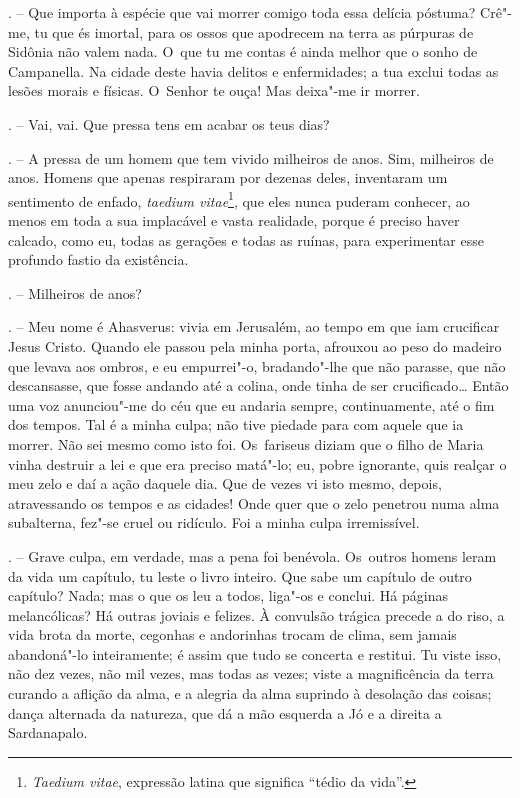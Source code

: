 \begin{Parskip}
. -- Que importa à espécie que vai morrer comigo toda essa
delícia póstuma? Crê"-me, tu que és imortal, para os ossos que apodrecem
na terra as púrpuras de Sidônia não valem nada. O~que tu me contas é
ainda melhor que o sonho de Campanella. Na cidade deste havia delitos e
enfermidades; a tua exclui todas as lesões morais e físicas. O~Senhor te
ouça! Mas deixa"-me ir morrer.

. -- Vai, vai. Que pressa tens em acabar os teus dias?

. -- A pressa de um homem que tem vivido milheiros de anos.
Sim, milheiros de anos. Homens que apenas respiraram por dezenas deles,
inventaram um sentimento de enfado, \emph{taedium vitae}\footnote{\emph{Taedium
  vitae}, expressão latina que significa ``tédio da vida''.}, que eles
nunca puderam conhecer, ao menos em toda a sua implacável e vasta
realidade, porque é preciso haver calcado, como eu, todas as gerações e
todas as ruínas, para experimentar esse profundo fastio da existência.

. -- Milheiros de anos?

. -- Meu nome é Ahasverus: vivia em Jerusalém, ao tempo em que
iam crucificar Jesus Cristo. Quando ele passou pela minha porta,
afrouxou ao peso do madeiro que levava aos ombros, e eu empurrei"-o,
bradando"-lhe que não parasse, que não descansasse, que fosse andando até
a colina, onde tinha de ser crucificado\ldots{} Então uma voz anunciou"-me do
céu que eu andaria sempre, continuamente, até o fim dos tempos. Tal é a
minha culpa; não tive piedade para com aquele que ia morrer. Não sei
mesmo como isto foi. Os~fariseus diziam que o filho de Maria vinha
destruir a lei e que era preciso matá"-lo; eu, pobre ignorante, quis
realçar o meu zelo e daí a ação daquele dia. Que de vezes vi isto mesmo,
depois, atravessando os tempos e as cidades! Onde quer que o zelo
penetrou numa alma subalterna, fez"-se cruel ou ridículo. Foi a minha
culpa irremissível.

. -- Grave culpa, em verdade, mas a pena foi benévola. Os~outros
homens leram da vida um capítulo, tu leste o livro inteiro. Que sabe um
capítulo de outro capítulo? Nada; mas o que os leu a todos, liga"-os e
conclui. Há páginas melancólicas? Há outras joviais e felizes. À
convulsão trágica precede a do riso, a vida brota da morte, cegonhas e
andorinhas trocam de clima, sem jamais abandoná"-lo inteiramente; é assim
que tudo se concerta e restitui. Tu viste isso, não dez vezes, não mil
vezes, mas todas as vezes; viste a magnificência da terra curando a
aflição da alma, e a alegria da alma suprindo à desolação das coisas;
dança alternada da natureza, que dá a mão esquerda a Jó e a direita a
Sardanapalo.


\end{Parskip}
